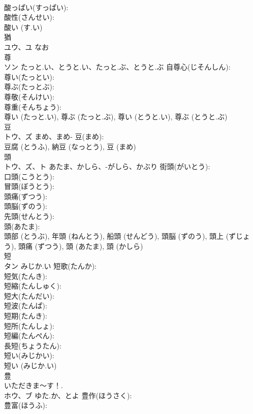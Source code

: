\documentclass[8pt]{extreport}
\begin{document}
\begin{CJK}{UTF8}{min}
\\	酸っぱい(すっぱい): 
\\	酸性(さんせい): 
\\	酸い (す.い)
\\	猶			
\\	ユウ、ユ	なお		
\\	尊			
\\	ソン	たっと.い、とうと.い、たっと.ぶ、とうと.ぶ	自尊心(じそんしん): 
\\	尊い(たっとい): 
\\	尊ぶ(たっとぶ): 
\\	尊敬(そんけい): 
\\	尊重(そんちょう): 
\\	尊い (たっと.い), 尊ぶ (たっと.ぶ), 尊い (とうと.い), 尊ぶ (とうと.ぶ)
\\	豆			
\\	トウ、ズ	まめ、まめ-	豆(まめ): 
\\	豆腐 (とうふ), 納豆 (なっとう), 豆 (まめ)
\\	頭			
\\	トウ、ズ、ト	あたま、かしら、-がしら、かぶり	街頭(がいとう): 
\\	口頭(こうとう): 
\\	冒頭(ぼうとう): 
\\	頭痛(ずつう): 
\\	頭脳(ずのう): 
\\	先頭(せんとう): 
\\	頭(あたま): 
\\	頭部 (とうぶ), 年頭 (ねんとう), 船頭 (せんどう), 頭脳 (ずのう), 頭上 (ずじょう), 頭痛 (ずつう), 頭 (あたま), 頭 (かしら)
\\	短			
\\	タン	みじか.い	短歌(たんか): 
\\	短気(たんき): 
\\	短縮(たんしゅく): 
\\	短大(たんだい): 
\\	短波(たんぱ): 
\\	短期(たんき): 
\\	短所(たんしょ): 
\\	短編(たんぺん): 
\\	長短(ちょうたん): 
\\	短い(みじかい): 
\\	短い (みじか.い)
\\	豊			
\\	いただきま〜す！.	
\\	ホウ、ブ	ゆた.か、とよ	豊作(ほうさく): 
\\	豊富(ほうふ): 

\end{CJK}
\end{document}
